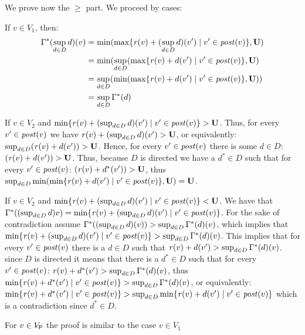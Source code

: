 \begin{myproof}
    We prove now the $\geq$ part.   We proceed by cases:
    
    If   $v \in V_1$,  then:
     \begin{align}
     \Gamma^* (\sup_{d \in D} d)(v) & = \min ( \max \{ \mathit{r}(v) + (\sup_{d \in D} d)(v') \mid v' \in \mathit{post}(v)\},  \mathbf{U} ) \\                                                                                       
                                                     & =\min(  \sup_{d \in D} ( \max \{\mathit{r}(v) + d(v') \mid v' \in \mathit{post}(v) \}, \mathbf{U} ) \\
                                                     & = \sup_{d \in D} (\min( \max \{ \mathit{r}(v) + d(v') \mid v' \in \mathit{post}(v) \}, \mathbf{U})) \\
                                                     & =  \sup_{d \in D} \Gamma^*(d)
    \end{align}
    
    If $v \in V_2$  and $\min \{ \mathit{r}(v) + (\sup_{d \in D} d)(v') \mid v' \in \mathit{post}(v)\} > \mathbf{U}$. Thus, for
    every $v' \in \mathit{post}(v)$ we have  $\mathit{r}(v) + (\sup_{d \in D} d)(v') > \mathbf{U}$, or equivalently: 
    $\sup_{d \in D} (\mathit{r}(v) + d(v')) > \mathbf{U}$. Hence, for every $v' \in \mathit{post}(v)$ there is some $d \in D$: $(\mathit{r}(v) + d(v')) > \mathbf{U}$.
    Thus, because $D$ is directed we have a $d^* \in D$ such that for every $v' \in \mathit{post}(v)$: $(\mathit{r}(v) + d^*(v')) > \mathbf{U}$, thus 
    $\sup_{d \in D} \min ( \min \{ \mathit{r}(v) + d(v') \mid v' \in \mathit{post}(v)\}, \mathbf{U}) = \mathbf{U}$.
     
     If $v \in V_2$  and $\min \{ \mathit{r}(v) + (\sup_{d \in D} d)(v') \mid v' \in \mathit{post}(v)\} < \mathbf{U}$.  We have that 
     $\Gamma^*((\sup_{d \in D} d) v) = \min \{ \mathit{r}(v) + (\sup_{d \in D} d)(v') \mid v' \in \mathit{post}(v)\}$.    For the sake of
     contradiction assume $\Gamma^*((\sup_{d \in D} d)(v)) > \sup_{d \in D} \Gamma^*(d)(v)$, which implies that
    $\min \{ \mathit{r}(v) + (\sup_{d \in D} d)(v') \mid v' \in \mathit{post}(v)\} > \sup_{d \in D} \Gamma^*(d)(v)$. This implies
    that for every $v' \in \mathit{post}(v)$ there is a $d \in D$ such that  $\mathit{r}(v) + d(v')  > \sup_{d \in D} \Gamma^*(d)(v)$.
    since $D$ is directed it means that there is a $d^* \in D$ such that for every $v' \in \mathit{post}(v)$: $\mathit{r}(v) + d^*(v')  > \sup_{d \in D} \Gamma^*(d)(v)$,
    thus $\min \{ \mathit{r}(v) + d^*(v') \mid v' \in \mathit{post}(v)  \} > \sup_{d \in D} \Gamma^*(d)(v)$, or equivalently:
    $\min \{ \mathit{r}(v) + d^*(v') \mid v' \in \mathit{post}(v)  \} > \sup_{d \in D} \min \{ \mathit{r}(v) + d(v') \mid v' \in \mathit{post}(v)\}$ which is a contradiction
    since $d^* \in D$.
     
    For $v \in V_{\mathsf{P}}$ the proof is similar to the case $v \in V_1$
    

\end{myproof}










